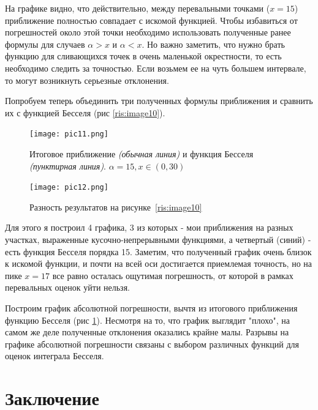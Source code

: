 \documentclass[14pt]{extarticle}
\begin{document}
На графике видно, что действительно, между перевальными точками ($x=15$) приближение полностью совпадает с искомой функцией. Чтобы избавиться от погрешностей около этой точки необходимо использовать полученные ранее формулы для случаев $\alpha>x$ и $\alpha<x$.  Но важно заметить, что нужно брать функцию для сливающихся точек в очень маленькой окрестности, то есть необходимо следить за точностью. Если возьмем ее на чуть большем интервале, то могут возникнуть серьезные отклонения.

Попробуем теперь объединить три полученных формулы приближения и сравнить их с функцией Бесселя (рис \ref{ris:image10}). 
  

\begin{figure}[h]
	\begin{center}
		\begin{minipage}[h]{0.45\linewidth}
			\texttt{[image: pic11.png]}
			\caption{Итоговое приближение \textit{(обычная линия)} и функция Бесселя \textit{(пунктирная линия)}. $\alpha=15, x \in (0, 30)$} %
			\label{ris:image10} %
		\end{minipage}
		\hfill 
		\begin{minipage}[h]{0.45\linewidth}
			\texttt{[image: pic12.png]}
			\caption{Разность результатов на рисунке~\ref{ris:image10}}
			\label{ris:image12}
		\end{minipage}
	\end{center}
\end{figure}


Для этого я построил 4 графика, 3 из которых - мои приближения на разных участках, выраженные кусочно-непрерывными функциями, а четвертый (синий) - есть функция Бесселя порядка 15. Заметим, что полученный график очень близок к искомой функции, и почти на всей оси достигается приемлемая точность, но на пике $x=17$ все равно осталась ощутимая погрешность, от которой в рамках перевальных оценок уйти нельзя. 

Построим график абсолютной погрешности, вычтя из итогового приближения функцию Бесселя (рис \ref{ris:image12}). Несмотря на то, что график выглядит "плохо", на самом же деле полученные отклонения оказались крайне малы. Разрывы на графике абсолютной погрешности связаны с выбором различных функций для оценок интеграла Бесселя.

\newpage
\section*{Заключение}
  
\end{document}
